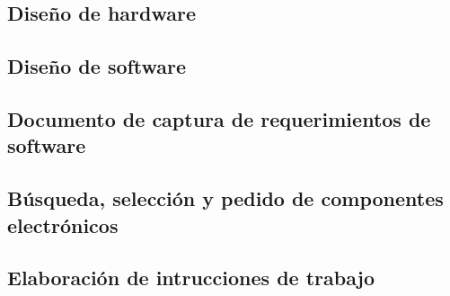 \documentclass[paper=letter,oneside,fontsize=11pt, parskip=full]{scrartcl}
\begin{document}
	\subsection{Diseño de hardware}
	\subsection{Diseño de software}
	\subsection{Documento de captura de requerimientos de software}
	\subsection{Búsqueda, selección y pedido de componentes electrónicos}
	
	\subsection{Elaboración de intrucciones de trabajo}

	

	
\end{document}
